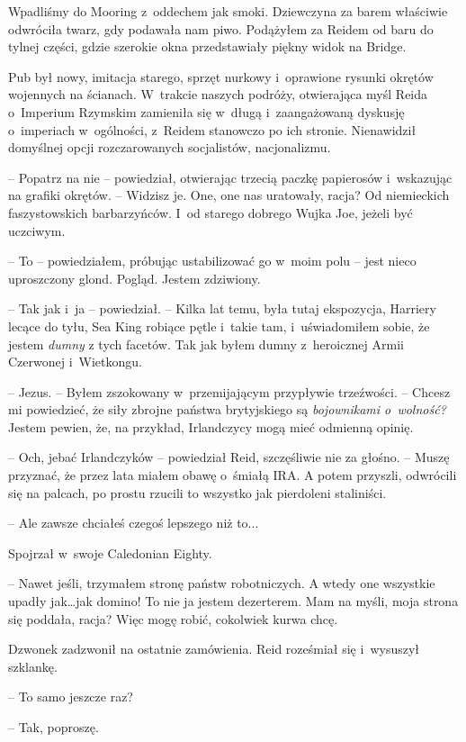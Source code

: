\documentclass[oneside,polish,11pt,sfheadings]{mwbk}
\begin{document}
Wpadliśmy do Mooring z~oddechem jak smoki. Dziewczyna za barem właściwie
odwróciła twarz, gdy podawała nam piwo. Podążyłem za Reidem od baru do
tylnej części, gdzie szerokie okna przedstawiały piękny widok na Bridge.

Pub był nowy, imitacja starego, sprzęt nurkowy i~oprawione rysunki
okrętów wojennych na ścianach. W~trakcie naszych podróży, otwierająca
myśl Reida o~Imperium Rzymskim zamieniła się w~długą i~zaangażowaną
dyskusję o~imperiach w~ogólności, z~Reidem stanowczo po ich stronie.
Nienawidził domyślnej opcji rozczarowanych socjalistów, nacjonalizmu.

-- Popatrz na nie -- powiedział, otwierając trzecią paczkę papierosów i~wskazując na grafiki okrętów. -- Widzisz je. One, one nas uratowały,
racja? Od niemieckich faszystowskich barbarzyńców. I~od starego dobrego
Wujka Joe, jeżeli być uczciwym.

-- To -- powiedziałem, próbując ustabilizować go w~moim polu -- jest nieco
uproszczony glond. Pogląd. Jestem zdziwiony.

-- Tak jak i~ja -- powiedział. -- Kilka lat temu, była tutaj ekspozycja,
Harriery lecące do tyłu, Sea King robiące pętle i~takie tam, i~uświadomiłem sobie, że jestem \emph{dumny }z tych facetów. Tak jak byłem
dumny z~heroicznej Armii Czerwonej i~Wietkongu.

-- Jezus. -- Byłem zszokowany w~przemijającym przypływie trzeźwości. -- Chcesz mi powiedzieć, że siły zbrojne państwa brytyjskiego są
\emph{bojownikami o~wolność?} Jestem pewien, że, na przykład,
Irlandczycy mogą mieć odmienną opinię.

-- Och, jebać Irlandczyków -- powiedział Reid, szczęśliwie nie za głośno.
-- Muszę przyznać, że przez lata miałem obawę o~śmiałą IRA. A potem
przyszli, odwrócili się na palcach, po prostu rzucili to wszystko jak
pierdoleni staliniści.

-- Ale zawsze chciałeś czegoś lepszego niż to...

Spojrzał w~swoje Caledonian Eighty. 

-- Nawet jeśli, trzymałem stronę
państw robotniczych. A wtedy one wszystkie upadły jak\ldots jak domino! To
nie ja jestem dezerterem. Mam na myśli, moja strona się poddała, racja?
Więc mogę robić, cokolwiek kurwa chcę.

Dzwonek zadzwonił na ostatnie zamówienia. Reid roześmiał się i~wysuszył
szklankę. 

-- To samo jeszcze raz?

-- Tak, poproszę.
\end{document}
